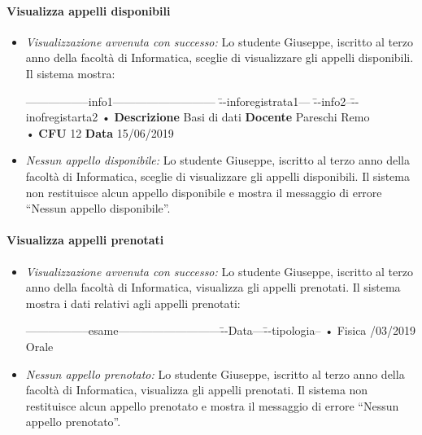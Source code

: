 \paragraph{Visualizza appelli disponibili}
\begin{itemize}
	\item \textit{Visualizzazione avvenuta con successo:}
	Lo studente Giuseppe, iscritto al terzo anno della facoltà di Informatica, sceglie di visualizzare gli appelli disponibili. Il sistema mostra:
	\begin{tabbing}
		\hspace{1cm}-----------------info1--------------------------- \= --inforegistrata1--- \= --info2--\=--inofregistarta2 \kill
		\hspace{1cm} • \textbf{Descrizione} Basi di dati \> \textbf{Docente} Pareschi Remo
		\\
		\hspace{1cm} •  \textbf{CFU} 12  \> \textbf{Data} 15/06/2019 \\
	\end{tabbing}
	
	\item \textit{Nessun appello disponibile:}
	Lo studente Giuseppe, iscritto al terzo anno della facoltà di Informatica, sceglie di visualizzare gli appelli disponibili. Il sistema non restituisce alcun appello disponibile e mostra il messaggio di errore “Nessun appello disponibile”.
\end{itemize}

\paragraph{Visualizza appelli prenotati}
\begin{itemize}
	\item \textit{Visualizzazione avvenuta con successo:}
	Lo studente Giuseppe, iscritto al terzo anno della facoltà di Informatica, visualizza gli appelli prenotati. Il sistema mostra i dati relativi agli appelli prenotati: 
	\begin{tabbing}
		\hspace{1cm}-----------------esame---------------------------\=--Data---\= --tipologia--\kill
		\hspace{1cm} • Fisica /03/2019 \> \hspace{1cm}Orale \\
	\end{tabbing}
	
	\item \textit{Nessun appello prenotato:}
	Lo studente Giuseppe, iscritto al terzo anno della facoltà di Informatica, visualizza gli appelli prenotati. Il sistema non restituisce alcun appello prenotato e mostra il messaggio di errore “Nessun appello prenotato”. 
\end{itemize}

